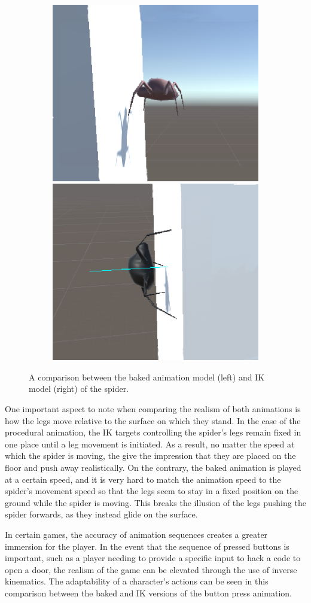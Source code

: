 \begin{figure}[!h]
\begin{subfigure}{\textwidth}
        \subcaption{}
        \label{fig:sp_round}
    \end{subfigure}
    \begin{subfigure}{\textwidth}
        \centering
        \includegraphics[width=0.4\linewidth]{grafika/sp_b_wall.eps}
        \hspace{0.1cm}
        \includegraphics[width=0.4\linewidth]{grafika/sp_ik_wall.eps}
        \subcaption{}
        \label{fig:sp_wall}
    \end{subfigure}
    \caption{A comparison between the baked animation model (left) and IK
    model (right) of the spider.}
    \label{fig:spider_comparison}
\end{figure}


One important aspect to note when comparing the realism of both animations is
how the legs move relative to the surface on which they stand. In the case of
the procedural animation, the IK targets controlling the spider's legs remain
fixed in one place until a leg movement is initiated. As a result, no matter the
speed at which the spider is moving, the give the impression that they are
placed on the floor and push away realistically. On the contrary, the baked
animation is played at a certain speed, and it is very hard to match the
animation speed to the spider's movement speed so that the legs seem to stay in a fixed
position on the ground while the spider is moving. This breaks the illusion of
the legs pushing the spider forwards, as they instead glide on the surface.

In certain games, the accuracy of animation sequences creates a greater
immersion for the player. In the event that the sequence of pressed buttons is
important, such as a player needing to provide a specific input to hack a code
to open a door, the realism of the game can be elevated through the use of
inverse kinematics. The adaptability of a character's actions can be seen in this
comparison between the baked and IK versions of the button press animation.

